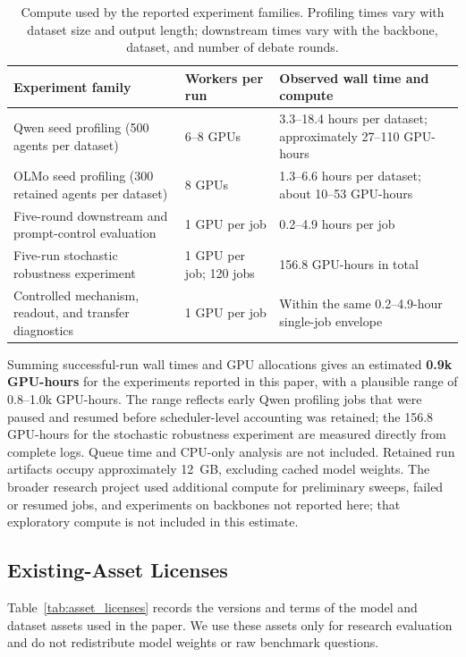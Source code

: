 \begin{table}[H]
\centering
\caption{Compute used by the reported experiment families. Profiling times vary
with dataset size and output length; downstream times vary with the backbone,
dataset, and number of debate rounds.}
\label{tab:compute_resources}
\small
\begin{tabular}{p{}p{}p{}}
\toprule
Experiment family & Workers per run & Observed wall time and compute \\
\midrule
Qwen seed profiling (500 agents per dataset)
    & 6--8 GPUs
    & 3.3--18.4 hours per dataset; approximately 27--110 GPU-hours \\
OLMo seed profiling (300 retained agents per dataset)
    & 8 GPUs
    & 1.3--6.6 hours per dataset; about 10--53 GPU-hours \\
Five-round downstream and prompt-control evaluation
    & 1 GPU per job
    & 0.2--4.9 hours per job \\
Five-run stochastic robustness experiment
    & 1 GPU per job; 120 jobs
    & 156.8 GPU-hours in total \\
Controlled mechanism, readout, and transfer diagnostics
    & 1 GPU per job
    & Within the same 0.2--4.9-hour single-job envelope \\
\bottomrule
\end{tabular}
\end{table}

Summing successful-run wall times and GPU allocations gives an estimated
\textbf{0.9k GPU-hours} for the experiments reported in this paper, with a
plausible range of 0.8--1.0k GPU-hours. The range reflects early Qwen profiling
jobs that were paused and resumed before scheduler-level accounting was
retained; the 156.8 GPU-hours for the stochastic robustness experiment are
measured directly from complete logs. Queue time and CPU-only analysis are not
included. Retained run artifacts occupy approximately 12~GB, excluding cached
model weights. The broader research project used additional compute for
preliminary sweeps, failed or resumed jobs, and experiments on backbones not
reported here; that exploratory compute is not included in this estimate.

\subsection{Existing-Asset Licenses}
\label{app:asset_licenses}

Table~\ref{tab:asset_licenses} records the versions and terms of the model and
dataset assets used in the paper. We use these assets only for research
evaluation and do not redistribute model weights or raw benchmark questions.

